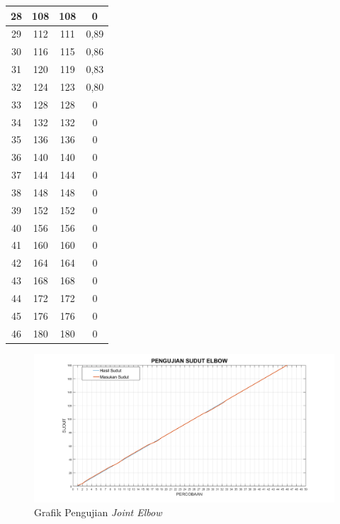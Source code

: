 \begin{longtable}{|c|c|c|c|}
	28 & 108     & 108      & 0           \\ \hline
	29 & 112     & 111      & 0,89 \\ \hline
	30 & 116     & 115      & 0,86 \\ \hline
	31 & 120     & 119      & 0,83 \\ \hline
	32 & 124     & 123      & 0,80 \\ \hline
	33 & 128     & 128      & 0           \\ \hline
	34 & 132     & 132      & 0           \\ \hline
	35 & 136     & 136      & 0           \\ \hline
	36 & 140     & 140      & 0           \\ \hline
	37 & 144     & 144      & 0           \\ \hline
	38 & 148     & 148      & 0           \\ \hline
	39 & 152     & 152      & 0           \\ \hline
	40 & 156     & 156      & 0           \\ \hline
	41 & 160     & 160      & 0           \\ \hline
	42 & 164     & 164      & 0           \\ \hline
	43 & 168     & 168      & 0           \\ \hline
	44 & 172     & 172      & 0           \\ \hline
	45 & 176     & 176      & 0           \\ \hline
	46 & 180     & 180      & 0           \\ \hline
\end{longtable}
\fontsize{12}{15}\selectfont
\begin{figure}[H]
	\centering
	\includegraphics[width=12cm]{gambar/pe.png}
	\caption{Grafik Pengujian \textit{Joint Elbow}}
	\label{pic.jointelbow}
\end{figure}

